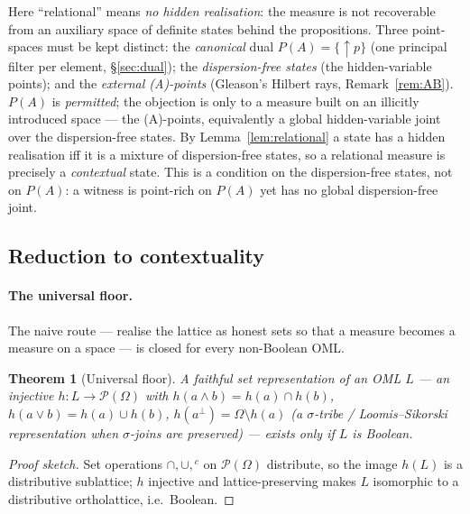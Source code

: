 \documentclass[11pt,reqno]{amsart}
\theoremstyle{plain}
\newtheorem{theorem}{Theorem}[section]
\theoremstyle{definition}
\theoremstyle{remark}
\begin{document}
\noindent Here ``relational'' means \emph{no hidden realisation}: the measure is not
recoverable from an auxiliary space of definite states behind the propositions. Three
point-spaces must be kept distinct: the
\emph{canonical} dual $P(A)=\{{\uparrow}p\}$ (one principal filter per element,
\S\ref{sec:dual}); the \emph{dispersion-free states} (the hidden-variable points);
and the \emph{external (A)-points} (Gleason's Hilbert rays, Remark~\ref{rem:AB}).
$P(A)$ is \emph{permitted}; the objection is only to a measure built on an
illicitly introduced space --- the (A)-points, equivalently a global hidden-variable joint over the
dispersion-free states. By Lemma~\ref{lem:relational} a state has a hidden
realisation iff it is a mixture of dispersion-free states, so a relational measure is
precisely a \emph{contextual} state. This is a condition on the dispersion-free
states, not on $P(A)$: a witness is point-rich on $P(A)$ yet has no global
dispersion-free joint.

\subsection{Reduction to contextuality}
\label{sec:reduction}
\label{sec:predicate}

\paragraph{The universal floor.} The naive route --- realise the lattice as honest
sets so that a measure becomes a measure on a space --- is closed for every
non-Boolean OML.

\begin{theorem}[Universal floor]\label{thm:floor}
A \emph{faithful set representation} of an OML $L$ --- an injective
$h:L\to\mathcal P(\Omega)$ with $h(a\wedge b)=h(a)\cap h(b)$, $h(a\vee b)=h(a)\cup
h(b)$, $h(a^\perp)=\Omega\setminus h(a)$ (a $\sigma$-tribe / Loomis--Sikorski
representation when $\sigma$-joins are preserved) --- exists only if $L$ is Boolean.
\end{theorem}
\begin{proof}[Proof sketch]
Set operations $\cap,\cup,{}^c$ on $\mathcal P(\Omega)$ distribute, so the image
$h(L)$ is a distributive sublattice; $h$ injective and lattice-preserving makes $L$
isomorphic to a distributive ortholattice, i.e.\ Boolean.
\end{proof}
\end{document}

